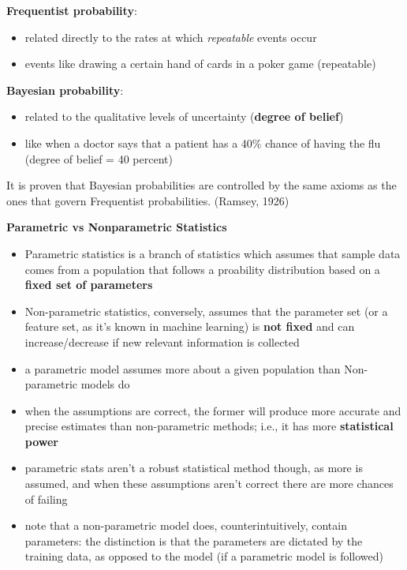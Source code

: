\documentclass[11pt, twocolumn]{report}
\begin{document}
\textbf{Frequentist probability}:
\begin{itemize}
  \item related directly to the rates at which \textit{repeatable} events occur
  \item events like drawing a certain hand of cards in a poker game (repeatable)
\end{itemize}

\textbf{Bayesian probability}:
\begin{itemize}
  \item related to the qualitative levels of uncertainty (\textbf{degree of
      belief})
  \item like when a doctor says that a patient has a 40\% chance of having the
    flu (degree of belief = 40 percent)
\end{itemize}

It is proven that Bayesian probabilities are controlled by the same axioms as
the ones that govern Frequentist probabilities. (Ramsey, 1926)

\textbf{Parametric vs Nonparametric Statistics}
\begin{itemize}
  \item Parametric statistics is a branch of statistics which assumes that
    sample data comes from a population that follows a proability distribution
    based on a \textbf{fixed set of parameters}
  \item Non-parametric statistics, conversely, assumes that the parameter set
    (or a feature set, as it's known in machine learning) is \textbf{not fixed}
    and can increase/decrease if new relevant information is collected
  \item a parametric model assumes more about a given population than
    Non-parametric models do
  \item when the assumptions are correct, the former will produce more accurate
    and precise estimates than non-parametric methods; i.e., it has more
    \textbf{statistical power}
  \item parametric stats aren't a robust statistical method though, as more is
    assumed, and when these assumptions aren't correct there are more chances
    of failing
  \item note that a non-parametric model does, counterintuitively, contain
    parameters: the distinction is that the parameters are dictated by the
    training data, as opposed to the model (if a parametric model is followed)
\end{itemize}
\end{document}
